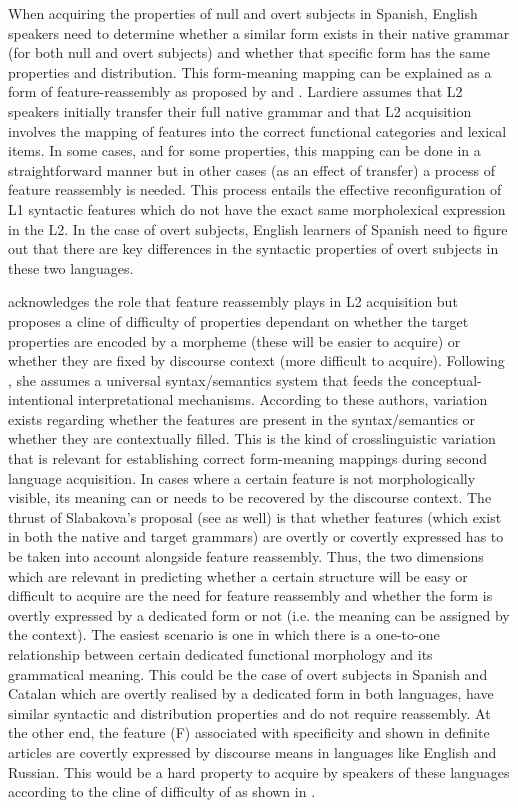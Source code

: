 \documentclass[output=paper]{langscibook}
\begin{document}
When acquiring the properties of null and overt subjects in Spanish, English speakers need to determine whether a similar form exists in their native grammar (for both null and overt subjects) and whether that specific form has the same properties and distribution. This form-meaning mapping can be explained as a form of feature-reassembly as proposed by \citet{Lardiere2005, Lardiere2008, Lardiere2009} and \citet{HwangLardiere2013}. Lardiere assumes that L2 speakers initially transfer their full native grammar and that L2 acquisition involves the mapping of features into the correct functional categories and lexical items. In some cases, and for some properties, this mapping can be done in a straightforward manner but in other cases (as an effect of transfer) a process of feature reassembly is needed. This process entails the effective reconfiguration of L1 syntactic features which do not have the exact same morpholexical expression in the L2.  In the case of overt subjects, English learners of Spanish need to figure out that there are key differences in the syntactic properties of overt subjects in these two languages.

\citet{Slabakova2009} acknowledges the role that feature reassembly plays in L2 acquisition but proposes a cline of difficulty of properties dependant on whether the target properties are encoded by a morpheme (these will be easier to acquire) or whether they are fixed by discourse context (more difficult to acquire). Following \citet{RamchandSvenonius2008}, she assumes a universal syntax/semantics system that feeds the conceptual-intentional interpretational mechanisms. According to these authors, variation exists regarding whether the features are present in the syntax/semantics or whether they are contextually filled. This is the kind of crosslinguistic variation that is relevant for establishing correct form-meaning mappings during second language acquisition. In cases where a certain feature is not morphologically visible, its meaning can or needs to be recovered by the discourse context. The thrust of Slabakova’s proposal (see \citealt{ChoSlabakova2014} as well) is that whether features (which exist in both the native and target grammars) are overtly or covertly expressed has to be taken into account alongside feature reassembly. Thus, the two dimensions which are relevant in predicting whether a certain structure will be easy or difficult to acquire are the need for feature reassembly and whether the form is overtly expressed by a dedicated form or not (i.e. the meaning can be assigned by the context). The easiest scenario is one in which there is a one-to-one rela\-tionship between certain dedicated functional morphology and its grammatical meaning. This could be the case of overt subjects in Spanish and Catalan which are overtly realised by a dedicated form in both languages, have similar syntactic and distribution properties and do not require reassembly. At the other end, the feature (F) associated with specificity and shown in definite articles are covertly expressed by discourse means in languages like English and Russian. This would be a hard property to acquire by speakers of these languages according to the cline of difficulty of \citet{ChoSlabakova2014} as shown in .\largerpage[-1]
\end{document}
